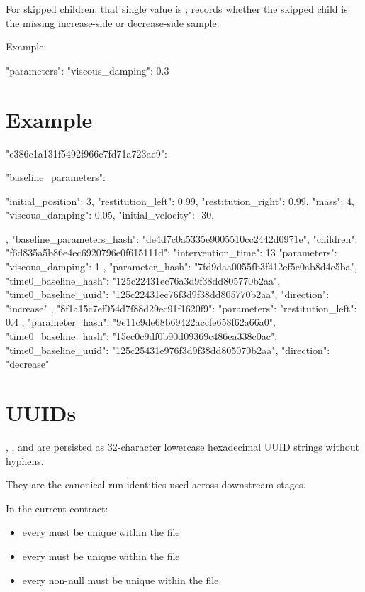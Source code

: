 \documentclass[11pt]{article}
\begin{document}
For skipped children, that single value is ;  records whether the skipped child is the missing increase-side or decrease-side sample.

Example:

\begin{DocCode}
{
  "parameters": {
    "viscous_damping": 0.3
  }
}
\end{DocCode}

\section*{Example}

\begin{DocCode}
{
  "e386c1a131f5492f966c7fd71a723ae9": {
    "baseline_parameters": {
      "initial_position": 3,
      "restitution_left": 0.99,
      "restitution_right": 0.99,
      "mass": 4,
      "viscous_damping": 0.05,
      "initial_velocity": -30,
      
    },
    "baseline_parameters_hash": "de4d7c0a5335e9005510cc2442d0971e",
    "children": {
      "f6d835a5b86e4ec6920796e0f615111d": {
        "intervention_time": 13
        "parameters": {
          "viscous_damping": 1
        },
        "parameter_hash": "7fd9daa0055fb3f412ef5e0ab8d4c5ba",
        "time0_baseline_hash": "125c22431ec76a3d9f38dd805770b2aa",
        "time0_baseline_uuid": "125c22431ec76f3d9f38dd805770b2aa",
        "direction": "increase"
      },
      "8f1a15c7ef054d7f88d29ec91f1620f9": {
        "parameters": {
          "restitution_left": 0.4
        },
        "parameter_hash": "9e11c9de68b69422accfe658f62a66a0",
        "time0_baseline_hash": "15ec0c9df0b90d09369c486ea338c0ac",
        "time0_baseline_uuid": "125c25431e976f3d9f38dd805070b2aa",
        "direction": "decrease"
      }
    }
  }
}
\end{DocCode}

\section*{UUIDs}

, , and  are
persisted as 32-character lowercase hexadecimal UUID strings without hyphens.

They are the canonical run identities used across downstream stages.

In the current contract:
\begin{itemize}
\item every  must be unique within the file
\item every  must be unique within the file
\item every non-null  must be unique within the file
\end{itemize}
\end{document}
